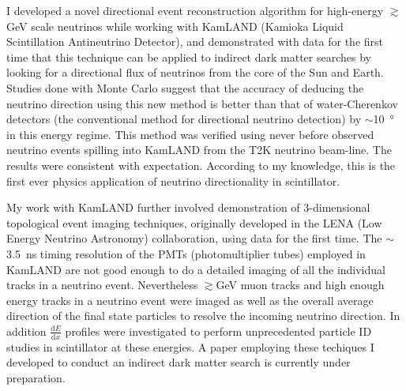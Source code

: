 \documentclass[10pt]{article} %
\begin{document}
I developed a novel directional event reconstruction algorithm for high-energy
$\gtrsim$\si{\giga\electronvolt} scale neutrinos while working with KamLAND
(Kamioka Liquid Scintillation Antineutrino Detector), and demonstrated with
data for the first time that this technique can be applied to indirect dark
matter searches by looking for a directional flux of neutrinos from the core of
the Sun and Earth. Studies done with Monte Carlo suggest that the accuracy of
deducing the neutrino direction using this new method is better than that of
water-Cherenkov detectors (the conventional method for directional neutrino
detection) by $\sim$\SI{10}{\degree} in this energy regime. This method was
verified using never before observed neutrino events spilling into KamLAND from
the T2K neutrino beam-line. The results were consistent with expectation.
According to my knowledge, this is the first ever physics application of
neutrino directionality in scintillator.

My work with KamLAND further involved demonstration of 3-dimensional
topological event imaging techniques, originally developed in the LENA (Low
Energy Neutrino Astronomy) collaboration, using data for the first time. The
$\sim$\SI{3.5}{\nano\second} timing resolution of the PMTs (photomultiplier
tubes) employed in KamLAND are not good enough to do a detailed imaging of all
the individual tracks in a neutrino event. Nevertheless
$\gtrsim$\si{\giga\electronvolt} muon tracks and high enough energy tracks in a
neutrino event were imaged as well as the overall average direction of the
final state particles to resolve the incoming neutrino direction. In addition
$\frac{\mathrm{d}E}{\mathrm{d}x}$ profiles were investigated to perform
unprecedented particle ID studies in scintillator at these energies. A paper
employing these techiques I developed to conduct an indirect dark matter search
is currently under preparation.
\end{document}

